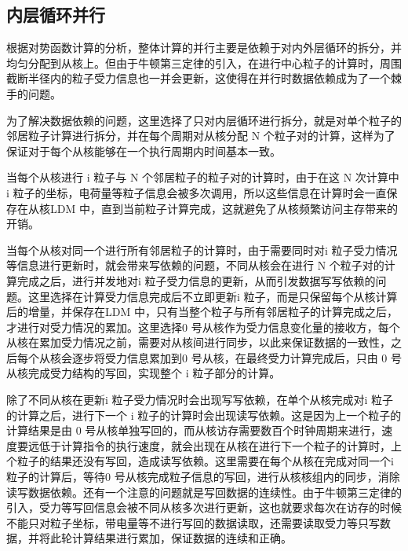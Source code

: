 \subsection{内层循环并行}
根据对势函数计算的分析，整体计算的并行主要是依赖于对内外层循环的拆分，并均匀分配到从核上。但由于牛顿第三定律的引入，在进行中心粒子的计算时，周围截断半径内的粒子受力信息也一并会更新，这使得在并行时数据依赖成为了一个棘手的问题。

为了解决数据依赖的问题，这里选择了只对内层循环进行拆分，就是对单个粒子的邻居粒子计算进行拆分，并在每个周期对从核分配 N 个粒子对的计算，这样为了保证对于每个从核能够在一个执行周期内时间基本一致。

当每个从核进行 i 粒子与 N 个邻居粒子的粒子对的计算时，由于在这 N 次计算中i 粒子的坐标，电荷量等粒子信息会被多次调用，所以这些信息在计算时会一直保存在从核LDM 中，直到当前粒子计算完成，这就避免了从核频繁访问主存带来的开销。

当每个从核对同一个进行所有邻居粒子的计算时，由于需要同时对i 粒子受力情况等信息进行更新时，就会带来写依赖的问题，不同从核会在进行 N 个粒子对的计算完成之后，进行并发地对i 粒子受力信息的更新，从而引发数据写写依赖的问题。这里选择在计算受力信息完成后不立即更新i 粒子，而是只保留每个从核计算后的增量，并保存在LDM 中，只有当整个粒子与所有邻居粒子的计算完成之后，才进行对受力情况的累加。这里选择0 号从核作为受力信息变化量的接收方，每个从核在累加受力情况之前，需要对从核间进行同步，以此来保证数据的一致性，之后每个从核会逐步将受力信息累加到0 号从核，在最终受力计算完成后，只由 0 号从核完成受力结构的写回，实现整个 i 粒子部分的计算。

除了不同从核在更新i 粒子受力情况时会出现写写依赖，在单个从核完成对i 粒子的计算之后，进行下一个 i 粒子的计算时会出现读写依赖。这是因为上一个粒子的计算结果是由 0 号从核单独写回的，而从核访存需要数百个时钟周期来进行，速度要远低于计算指令的执行速度，就会出现在从核在进行下一个粒子的计算时，上个粒子的结果还没有写回，造成读写依赖。这里需要在每个从核在完成对同一个i 粒子的计算后，等待0 号从核完成粒子信息的写回，进行从核核组内的同步，消除读写数据依赖。还有一个注意的问题就是写回数据的连续性。由于牛顿第三定律的引入，受力等写回信息会被不同从核多次进行更新，这也就要求每次在访存的时候不能只对粒子坐标，带电量等不进行写回的数据读取，还需要读取受力等只写数据，并将此轮计算结果进行累加，保证数据的连续和正确。

